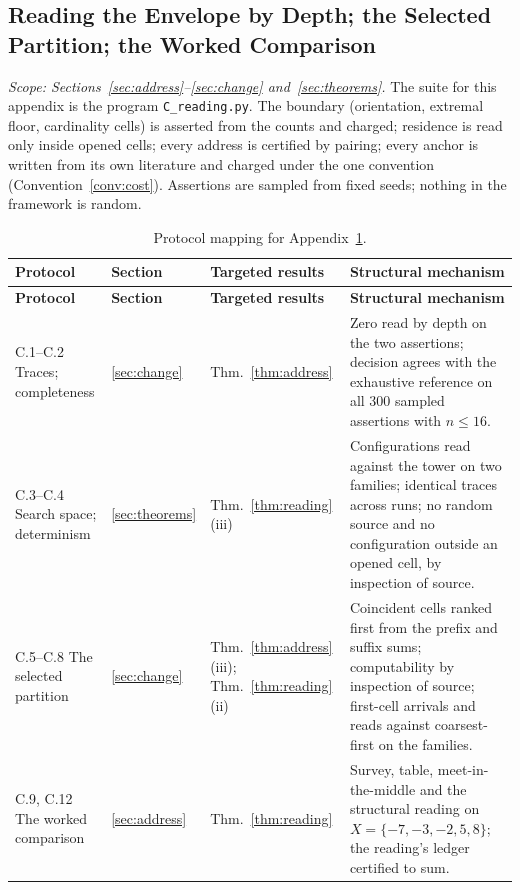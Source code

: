 \documentclass[pdflatex,sn-mathphys-num]{sn-jnl}
\theoremstyle{thmstyleone}%
\theoremstyle{thmstyletwo}%
\theoremstyle{thmstylethree}%
\begin{document}
\begin{appendices}
\section{Reading the Envelope by Depth; the Selected Partition; the Worked Comparison}\label{app:C}
\emph{Scope: Sections~\ref{sec:address}--\ref{sec:change} and~\ref{sec:theorems}.} The suite for this appendix is the program \texttt{C\_reading.py}. The boundary (orientation, extremal floor, cardinality cells) is asserted from the counts and charged; residence is read only inside opened cells; every address is certified by pairing; every anchor is written from its own literature and charged under the one convention (Convention~\ref{conv:cost}). Assertions are sampled from fixed seeds; nothing in the framework is random.

\begingroup\small\renewcommand{\arraystretch}{1.3}
\begin{longtable}{@{} p{} p{} p{} p{} @{}}
\caption{Protocol mapping for Appendix~\ref{app:C}.}\label{tab:appC_mapping}\\
\toprule
\textbf{Protocol} & \textbf{Section} & \textbf{Targeted results} & \textbf{Structural mechanism} \\
\midrule
\endfirsthead
\toprule
\textbf{Protocol} & \textbf{Section} & \textbf{Targeted results} & \textbf{Structural mechanism} \\
\midrule
\endhead
\bottomrule
\endfoot
C.1--C.2 Traces; completeness & \ref{sec:change} & Thm.~\ref{thm:address} & Zero read by depth on the two assertions; decision agrees with the exhaustive reference on all 300 sampled assertions with $n\le16$. \\
C.3--C.4 Search space; determinism & \ref{sec:theorems} & Thm.~\ref{thm:reading}(iii) & Configurations read against the tower on two families; identical traces across runs; no random source and no configuration outside an opened cell, by inspection of source. \\
C.5--C.8 The selected partition & \ref{sec:change} & Thm.~\ref{thm:address}(iii); Thm.~\ref{thm:reading}(ii) & Coincident cells ranked first from the prefix and suffix sums; computability by inspection of source; first-cell arrivals and reads against coarsest-first on the families. \\
C.9, C.12 The worked comparison & \ref{sec:address} & Thm.~\ref{thm:reading} & Survey, table, meet-in-the-middle and the structural reading on $X=\{-7,-3,-2,5,8\}$; the reading's ledger certified to sum. \\

\end{longtable}
\end{appendices}
\end{document}
